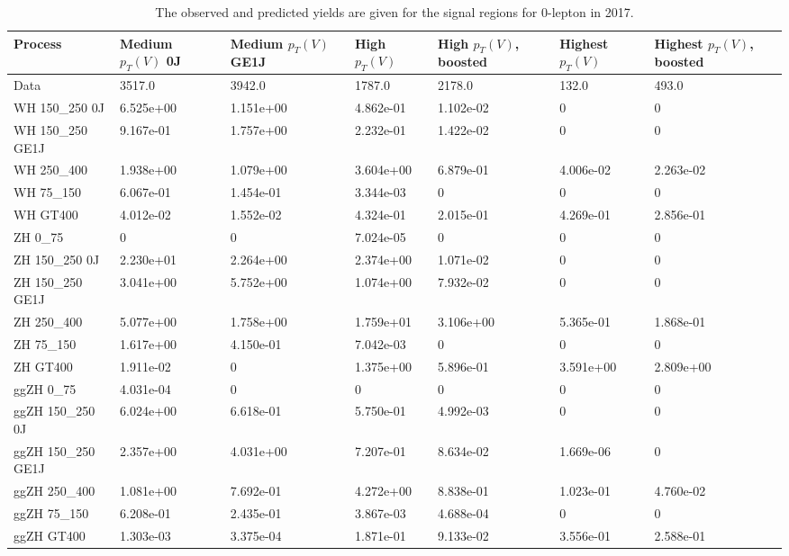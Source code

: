 \begin{table}
\centering
\caption[2017 0-lepton signal selection yields]{
                  The observed and predicted yields are given for the
                  signal regions for 0-lepton in 2017.
                  }
{\footnotesize
\begin{tabularx}{\textwidth}{|X|X|X|X|X|X|X|}
\hline
Process & Medium $p_{T}(V)$ 0J & Medium $p_{T}(V)$ GE1J & High $p_{T}(V)$ & High $p_{T}(V)$, boosted & Highest $p_{T}(V)$ & Highest $p_{T}(V)$, boosted \\
\hline
Data & 3517.0 & 3942.0 & 1787.0 & 2178.0 & 132.0 & 493.0 \\
\hline
WH 150\_250 0J & 6.525e+00 & 1.151e+00 & 4.862e-01 & 1.102e-02 & 0 & 0 \\
WH 150\_250 GE1J & 9.167e-01 & 1.757e+00 & 2.232e-01 & 1.422e-02 & 0 & 0 \\
WH 250\_400 & 1.938e+00 & 1.079e+00 & 3.604e+00 & 6.879e-01 & 4.006e-02 & 2.263e-02 \\
WH 75\_150 & 6.067e-01 & 1.454e-01 & 3.344e-03 & 0 & 0 & 0 \\
WH GT400 & 4.012e-02 & 1.552e-02 & 4.324e-01 & 2.015e-01 & 4.269e-01 & 2.856e-01 \\
ZH 0\_75 & 0 & 0 & 7.024e-05 & 0 & 0 & 0 \\
ZH 150\_250 0J & 2.230e+01 & 2.264e+00 & 2.374e+00 & 1.071e-02 & 0 & 0 \\
ZH 150\_250 GE1J & 3.041e+00 & 5.752e+00 & 1.074e+00 & 7.932e-02 & 0 & 0 \\
ZH 250\_400 & 5.077e+00 & 1.758e+00 & 1.759e+01 & 3.106e+00 & 5.365e-01 & 1.868e-01 \\
ZH 75\_150 & 1.617e+00 & 4.150e-01 & 7.042e-03 & 0 & 0 & 0 \\
ZH GT400 & 1.911e-02 & 0 & 1.375e+00 & 5.896e-01 & 3.591e+00 & 2.809e+00 \\
ggZH 0\_75 & 4.031e-04 & 0 & 0 & 0 & 0 & 0 \\
ggZH 150\_250 0J & 6.024e+00 & 6.618e-01 & 5.750e-01 & 4.992e-03 & 0 & 0 \\
ggZH 150\_250 GE1J & 2.357e+00 & 4.031e+00 & 7.207e-01 & 8.634e-02 & 1.669e-06 & 0 \\
ggZH 250\_400 & 1.081e+00 & 7.692e-01 & 4.272e+00 & 8.838e-01 & 1.023e-01 & 4.760e-02 \\
ggZH 75\_150 & 6.208e-01 & 2.435e-01 & 3.867e-03 & 4.688e-04 & 0 & 0 \\
ggZH GT400 & 1.303e-03 & 3.375e-04 & 1.871e-01 & 9.133e-02 & 3.556e-01 & 2.588e-01 \\

\end{tabularx}}
\end{table}
